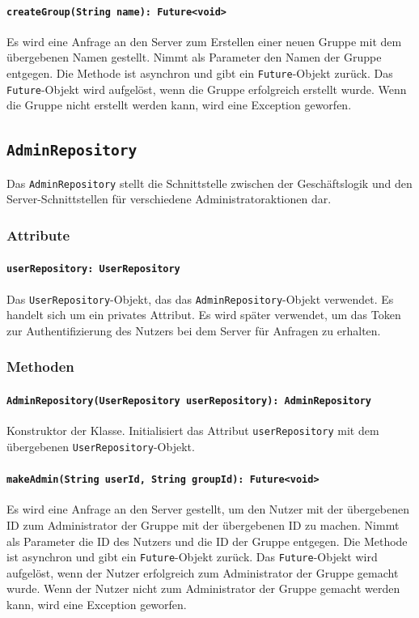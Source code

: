 \documentclass[parskip=full]{scrartcl}
\begin{document}
\paragraph{\texttt{createGroup(String name): Future<void>}}
Es wird eine Anfrage an den Server zum Erstellen einer neuen Gruppe mit dem übergebenen Namen gestellt. Nimmt als Parameter den Namen der Gruppe entgegen. Die Methode ist asynchron und gibt ein \texttt{Future}-Objekt zurück. Das \texttt{Future}-Objekt wird aufgelöst, wenn die Gruppe erfolgreich erstellt wurde. Wenn die Gruppe nicht erstellt werden kann, wird eine Exception geworfen.

\newpage
\subsection{\texttt{AdminRepository}}
Das \texttt{AdminRepository} stellt die Schnittstelle zwischen der Geschäftslogik und den Server-Schnittstellen für verschiedene Administratoraktionen dar.
\subsubsection*{Attribute}
\paragraph{\texttt{userRepository: UserRepository}}
Das \texttt{UserRepository}-Objekt, das das \texttt{AdminRepository}-Objekt verwendet. Es handelt sich um ein privates Attribut. Es wird später verwendet, um das Token zur Authentifizierung des Nutzers bei dem Server für Anfragen zu erhalten.
\subsubsection*{Methoden}
\paragraph{\texttt{AdminRepository(UserRepository userRepository): AdminRepository}}
Konstruktor der Klasse. Initialisiert das Attribut \texttt{userRepository} mit dem übergebenen \texttt{UserRepository}-Objekt.
\paragraph{\texttt{makeAdmin(String userId, String groupId): Future<void>}}
Es wird eine Anfrage an den Server gestellt, um den Nutzer mit der übergebenen ID zum Administrator der Gruppe mit der übergebenen ID zu machen. Nimmt als Parameter die ID des Nutzers und die ID der Gruppe entgegen. Die Methode ist asynchron und gibt ein \texttt{Future}-Objekt zurück. Das \texttt{Future}-Objekt wird aufgelöst, wenn der Nutzer erfolgreich zum Administrator der Gruppe gemacht wurde. Wenn der Nutzer nicht zum Administrator der Gruppe gemacht werden kann, wird eine Exception geworfen.
\end{document}
